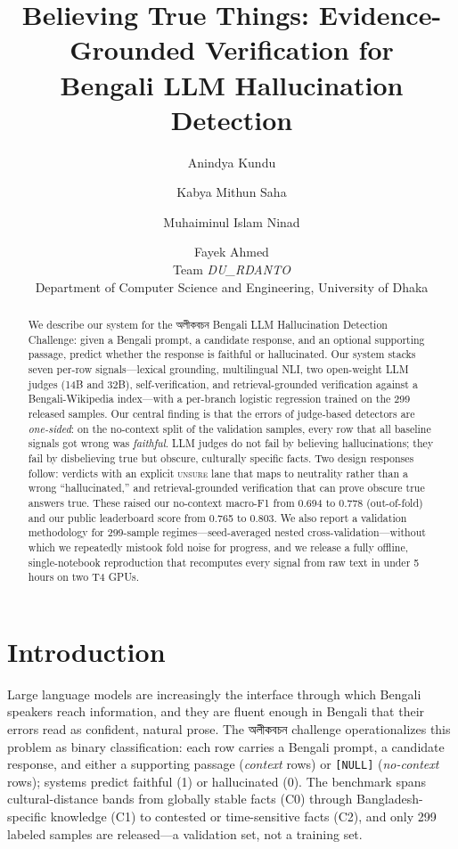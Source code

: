 \documentclass[11pt]{article}
\title{Believing True Things: Evidence-Grounded Verification for\\Bengali LLM Hallucination Detection}
\author{Anindya Kundu \and Kabya Mithun Saha \and Muhaiminul Islam Ninad \and Fayek Ahmed \\
  Team \textit{DU\_RDANTO} \\
  Department of Computer Science and Engineering, University of Dhaka}
\newcommand{\bn}[1]{{\bengalifont #1}}
\begin{document}
\maketitle

\begin{abstract}
We describe our system for the \bn{অলীকবচন} Bengali LLM Hallucination
Detection Challenge: given a Bengali prompt, a candidate response, and an
optional supporting passage, predict whether the response is faithful or
hallucinated. Our system stacks seven per-row signals---lexical grounding,
multilingual NLI, two open-weight LLM judges (14B and 32B), self-verification,
and retrieval-grounded verification against a Bengali-Wikipedia index---with a
per-branch logistic regression trained on the 299 released samples. Our
central finding is that the errors of judge-based detectors are
\emph{one-sided}: on the no-context split of the validation samples, every row
that all baseline signals got wrong was \emph{faithful}. LLM judges do not
fail by believing hallucinations; they fail by disbelieving true but obscure,
culturally specific facts. Two design responses follow: verdicts with an
explicit \textsc{unsure} lane that maps to neutrality rather than a wrong
``hallucinated,'' and retrieval-grounded verification that can prove obscure
true answers true. These raised our no-context macro-F1 from 0.694 to 0.778
(out-of-fold) and our public leaderboard score from 0.765 to 0.803. We also
report a validation methodology for 299-sample regimes---seed-averaged nested
cross-validation---without which we repeatedly mistook fold noise for
progress, and we release a fully offline, single-notebook reproduction that
recomputes every signal from raw text in under 5 hours on two T4 GPUs.
\end{abstract}

\section{Introduction}

Large language models are increasingly the interface through which Bengali
speakers reach information, and they are fluent enough in Bengali that their
errors read as confident, natural prose. The \bn{অলীকবচন} challenge
operationalizes this problem as binary classification: each row carries a
Bengali prompt, a candidate response, and either a supporting passage
(\emph{context} rows) or \texttt{[NULL]} (\emph{no-context} rows); systems
predict faithful (1) or hallucinated (0). The benchmark spans cultural-distance
bands from globally stable facts (C0) through Bangladesh-specific knowledge
(C1) to contested or time-sensitive facts (C2), and only 299 labeled samples
are released---a validation set, not a training set.
\end{document}
